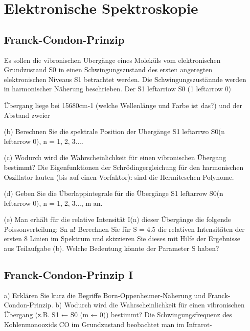 \renewcommand{\lastmod}{\today}

\chapter{Elektronische Spektroskopie}



\section{Franck-Condon-Prinzip}

 
Es sollen die vibronischen Ubergänge eines Moleküls vom elektronischen Grundzustand S0 in
einen Schwingungszustand des ersten angeregten elektronischen Niveaus S1 betrachtet werden. Die Schwingungszustännde werden in harmonischer Näherung beschrieben. Der S1 leftarriow S0 (1 leftarrow 0)
 
Übergang liege bei 15680cm-1 (welche Wellenlänge und Farbe ist das?) und der Abstand zweier

(b) Berechnen Sie die spektrale Position der Ubergänge S1 leftarrwo S0(n leftarrow 0), n = 1, 2, 3....
 
(c) Wodurch wird die Wahrscheinlichkeit für einen vibronischen Übergang bestimmt?
Die Eigenfunktionen der Schrödingergleichung für den harmonischen Oszillator lauten (bis auf einen Vorfaktor):
sind die Hermiteschen Polynome.

(d) Geben Sie die Überlappintegrale für die Übergänge S1 leftarrow S0(n leftarrow 0), n = 1, 2, 3..., m an.

(e) Man erhält für die relative Intensität I(n) dieser Übergänge die folgende Poissonverteilung:
Sn n!
Berechnen Sie für S = 4.5 die relativen Intensitäten der ersten 8 Linien im Spektrum und skizzieren Sie dieses mit Hilfe der Ergebnisse aus Teilaufgabe (b). Welche Bedeutung könnte der Parameter S haben?



\section{Franck-Condon-Prinzip I}

a) Erklären Sie kurz die Begriffe Born-Oppenheimer-Näherung und Franck-Condon-Prinzip.
b) Wodurch wird die Wahrscheinlichkeit für einen vibronischen Übergang (z.B. S1 ← S0 (m ← 0))
bestimmt?
Die Schwingungsfrequenz des Kohlenmonooxids CO im Grundzustand beobachtet man im Infrarot-


